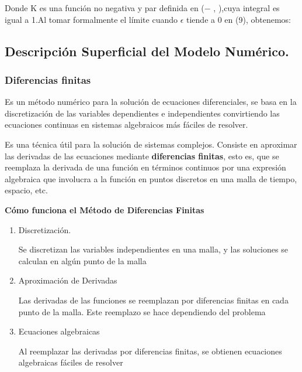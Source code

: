 \documentclass[letterpaper]{article}
\begin{document}
{\begin{equation}
        \end{equation}

        \normalsize{Donde K es una función no negativa y par definida en (− \infty, \infty),cuya integral es igual a 1.Al tomar formalmente el límite cuando $\epsilon$ tiende a 0 en (9), obtenemos:}\\


        
        \subsection{Descripción Superficial del Modelo Numérico.}
        
            \subsubsection{Diferencias finitas}

            Es un método numérico para la solución de ecuaciones diferenciales, se basa en la discretización de las variables dependientes e independientes convirtiendo las ecuaciones continuas en sistemas algebraicos más fáciles de resolver.

             Es una técnica útil para la solución de sistemas complejos. Consiste en aproximar las derivadas de las ecuaciones mediante \textbf{diferencias finitas}, esto es, que se reemplaza la derivada de una función en términos continuos por una expresión algebraica que involucra a la función en puntos discretos en una malla de tiempo, espacio, etc.

            \textbf{{Cómo funciona el Método de Diferencias Finitas}}
                 \begin{enumerate}
                 \item Discretización.

                        Se discretizan las variables independientes en una malla, y las soluciones se calculan en algún punto de la malla

                \item Aproximación de Derivadas

                    Las derivadas de las funciones se reemplazan por diferencias finitas en cada punto de la malla. Este reemplazo se hace dependiendo del problema

                \item Ecuaciones algebraicas

                    Al reemplazar las derivadas por diferencias finitas, se obtienen ecuaciones algebraicas fáciles de resolver


\end{enumerate}}
\end{document}
